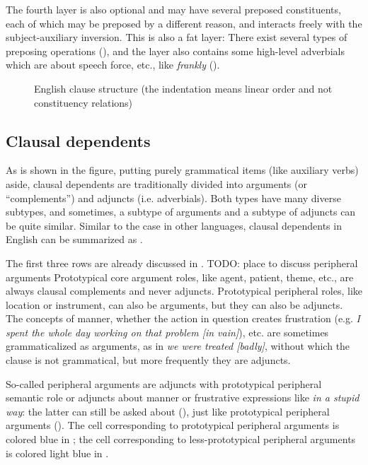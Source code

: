 \documentclass[UTF8, a4paper, oneside, scheme=plain, 12pt]{ctexbook}
\newcommand{\form}[1]{\emph{#1}}
\begin{document}
The fourth layer is also optional and may have several preposed constituents,
each of which may be preposed by a different reason,
and interacts freely with the subject-auxiliary inversion.
This is also a fat layer:
There exist several types of preposing operations (),
and the layer also contains some high-level adverbials
which are about speech force, etc., %
like \form{frankly} ().

\begin{figure}[H]
    \centering
    {\small }
    \caption{English clause structure (the indentation means linear order and not constituency relations)}
    \label{fig:clause-template}
\end{figure}

\subsection{Clausal dependents}\label{sec:simple-clause.dependents}

As is shown in the figure,
putting purely grammatical items (like auxiliary verbs) aside,
clausal dependents are traditionally divided into arguments (or ``complements'') 
and adjuncts (i.e. adverbials).
Both types have many diverse subtypes,
and sometimes, 
a subtype of arguments and a subtype of adjuncts can be quite similar.
Similar to the case in other languages, 
clausal dependents in English can be summarized as .

The first three rows are already discussed in . TODO: place to discuss peripheral arguments
Prototypical core argument roles, 
like agent, patient, theme, etc.,
are always clausal complements and never adjuncts.
Prototypical peripheral roles, like location or instrument, can also be arguments,
but they can also be adjuncts.
The concepts of manner, whether the action in question creates frustration 
(e.g. \form{I spent the whole day working on that problem [in vain]}), etc.
are sometimes grammaticalized as arguments,
as in \form{we were treated [badly]},
without which the clause is not grammatical,
but more frequently they are adjuncts.

So-called peripheral arguments
are adjuncts with prototypical peripheral semantic role
or adjuncts about manner or frustrative expressions like \form{in a stupid way}:
the latter can still be asked about (), 
just like prototypical peripheral arguments (). 
The cell corresponding to prototypical peripheral arguments
is colored blue in ;
the cell corresponding to less-prototypical peripheral arguments
is colored light blue in .
\end{document}
